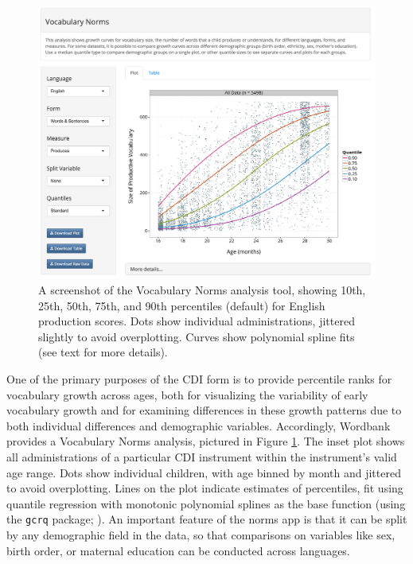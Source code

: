 \documentclass[doc,noapacite]{apa2}
\begin{document}
\begin{figure}[t]
\includegraphics[width=6in]{figures/normsapp.png}
\caption{\label{fig:norms} A screenshot of the Vocabulary Norms analysis tool, showing 10th, 25th, 50th, 75th, and 90th percentiles (default) for English production scores. Dots show individual administrations, jittered slightly to avoid overplotting. Curves show polynomial spline fits (see text for more details).}
\end{figure}

One of the primary purposes of the CDI form is to provide percentile ranks for vocabulary growth across ages, both for visualizing the variability of early vocabulary growth and for examining differences in these growth patterns due to both individual differences and demographic variables. Accordingly, Wordbank provides a Vocabulary Norms analysis, pictured in Figure \ref{fig:norms}. The inset plot shows all administrations of a particular CDI instrument within the instrument's valid age range. Dots show individual children, with age binned by month and jittered to avoid overplotting. Lines on the plot indicate estimates of percentiles, fit using quantile regression with monotonic polynomial splines as the base function (using the \texttt{gcrq} package; ). An important feature of the norms app is that it can be split by any demographic field in the data, so that comparisons on variables like sex, birth order, or maternal education can be conducted across languages. 
\end{document}
